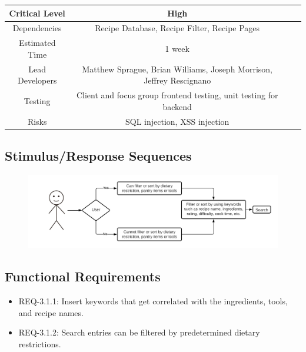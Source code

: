\documentclass{scrreprt}
\begin{document}
\begin{center}
    \begin{tabular}{| c | c | c | c |}
        \hline
        Critical Level  & High                                                                 \\
        \hline
        Dependencies    & Recipe Database, Recipe Filter, Recipe Pages                         \\
        \hline
        Estimated Time  & 1 week                                                               \\
        \hline
        Lead Developers & Matthew Sprague, Brian Williams, Joseph Morrison, Jeffrey Rescignano \\
        \hline
        Testing         & Client and focus group frontend testing, unit testing for backend    \\
        \hline
        Risks           & SQL injection, XSS injection                                         \\
        \hline
    \end{tabular}
\end{center}

\subsection{Stimulus/Response Sequences}

\begin{figure}[H]\centering
    \includegraphics[width=\columnwidth]{FlowCharts/Search-Search.png}
\end{figure}

\subsection{Functional Requirements}

\begin{itemize}
    \item REQ-3.1.1: Insert keywords that get correlated with the ingredients, tools, and recipe names.
    \item REQ-3.1.2: Search entries can be filtered by predetermined dietary restrictions.
\end{itemize}
\end{document}
